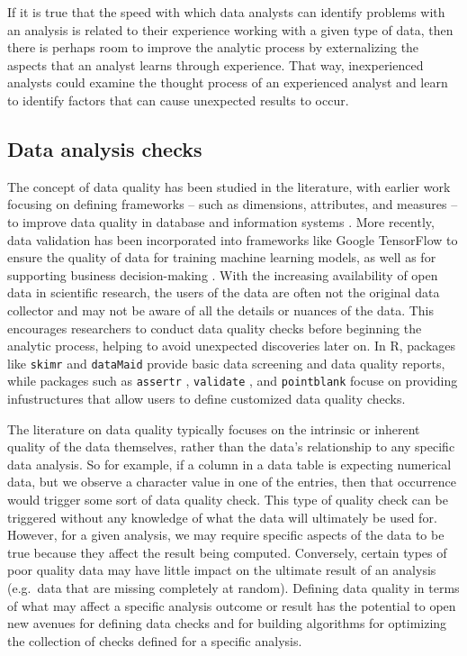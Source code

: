 \documentclass[
  12pt,
]{interact}
\begin{document}
If it is true that the speed with which data analysts can identify
problems with an analysis is related to their experience working with a
given type of data, then there is perhaps room to improve the analytic
process by externalizing the aspects that an analyst learns through
experience. That way, inexperienced analysts could examine the thought
process of an experienced analyst and learn to identify factors that can
cause unexpected results to occur.

\subsection{Data analysis checks}\label{data-analysis-checks}

The concept of data quality has been studied in the literature, with
earlier work focusing on defining frameworks -- such as dimensions,
attributes, and measures -- to improve data quality in database and
information systems
\citep{wang1996beyond, batini2009methodologies, 6204995, woodall2014classification, cai2015challenges, 8642813}.
More recently, data validation has been incorporated into frameworks
like Google TensorFlow \citep{polyzotis2019data} to ensure the quality
of data for training machine learning models, as well as for supporting
business decision-making \citep{schelter2018automating}. With the
increasing availability of open data in scientific research, the users
of the data are often not the original data collector and may not be
aware of all the details or nuances of the data. This encourages
researchers to conduct data quality checks before beginning the analytic
process, helping to avoid unexpected discoveries later on. In R,
packages like \texttt{skimr} \citep{skimr} and \texttt{dataMaid}
\citep{dataMaid} provide basic data screening and data quality reports,
while packages such as \texttt{assertr} \citep{assertr},
\texttt{validate} \citep{validate}, and \texttt{pointblank}
\citep{pointblank} focuse on providing infustructures that allow users
to define customized data quality checks.

The literature on data quality typically focuses on the intrinsic or
inherent quality of the data themselves, rather than the data's
relationship to any specific data analysis. So for example, if a column
in a data table is expecting numerical data, but we observe a character
value in one of the entries, then that occurrence would trigger some
sort of data quality check. This type of quality check can be triggered
without any knowledge of what the data will ultimately be used for.
However, for a given analysis, we may require specific aspects of the
data to be true because they affect the result being computed.
Conversely, certain types of poor quality data may have little impact on
the ultimate result of an analysis (e.g.~data that are missing
completely at random). Defining data quality in terms of what may affect
a specific analysis outcome or result has the potential to open new
avenues for defining data checks and for building algorithms for
optimizing the collection of checks defined for a specific analysis.
\end{document}
